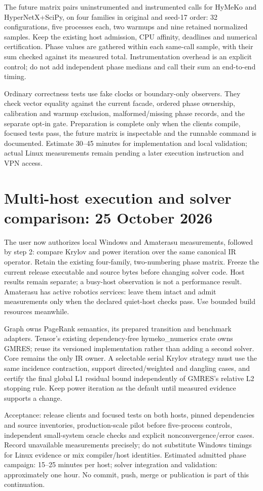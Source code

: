 \documentclass[10pt,a4paper]{article}
\begin{document}
The future matrix pairs uninstrumented and instrumented calls for HyMeKo and
HyperNetX+SciPy, on four families in original and seed-17 order: 32 configurations,
five processes each, two warmups and nine retained normalized samples. Keep the
existing host admission, CPU affinity, deadlines and numerical certification.
Phase values are gathered within each same-call sample, with their sum checked
against its measured total. Instrumentation overhead is an explicit control;
do not add independent phase medians and call their sum an end-to-end timing.

Ordinary correctness tests use fake clocks or boundary-only observers. They check
vector equality against the current facade, ordered phase ownership, calibration
and warmup exclusion, malformed/missing phase records, and the separate opt-in
gate. Preparation is complete only when the clients compile, focused tests pass,
the future matrix is inspectable and the runnable command is documented. Estimate
30--45 minutes for implementation and local validation; actual Linux measurements
remain pending a later execution instruction and VPN access.
\section*{Multi-host execution and solver comparison: 25 October 2026}
The user now authorizes local Windows and Amaterasu measurements, followed by
step 2: compare Krylov and power iteration over the same canonical IR operator.
Retain the existing four-family, two-numbering phase matrix. Freeze the current
release executable and source bytes before changing solver code. Host results
remain separate; a busy-host observation is not a performance result. Amaterasu
has active robotics services: leave them intact and admit measurements only when
the declared quiet-host checks pass. Use bounded build resources meanwhile.

Graph owns PageRank semantics, its prepared transition and benchmark adapters.
Tensor's existing dependency-free hymeko\_numerics crate owns GMRES; reuse its
versioned implementation rather than adding a second solver. Core remains the
only IR owner. A selectable serial Krylov strategy must use the same incidence
contraction, support directed/weighted and dangling cases, and certify the final
global L1 residual bound independently of GMRES's relative L2 stopping rule.
Keep power iteration as the default until measured evidence supports a change.

Acceptance: release clients and focused tests on both hosts, pinned dependencies
and source inventories, production-scale pilot before five-process controls,
independent small-system oracle checks and explicit nonconvergence/error cases.
Record unavailable measurements precisely; do not substitute Windows timings for
Linux evidence or mix compiler/host identities. Estimated admitted phase campaign:
15--25 minutes per host; solver integration and validation: approximately one hour.
No commit, push, merge or publication is part of this continuation.
\end{document}
